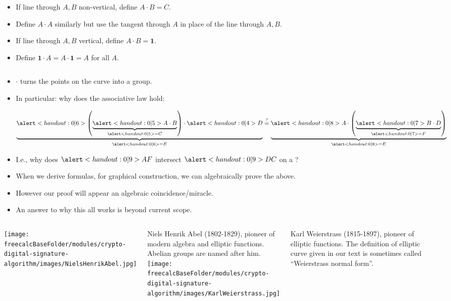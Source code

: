 \begin{frame}[fragile]
\begin{columns}
	\begin{definition}
		\begin{itemize}
			\item If line through $A,B$ non-vertical, define $A\cdot B = C$.
			\item Define $A\cdot A$ similarly but use the tangent through $A$ in place of the line through $A, B$.
			\item If line through $A,B$ vertical, define $A\cdot B = \mathbf 1$.
			\item Define $\mathbf 1\cdot A = A\cdot \mathbf 1 = A$ for all $ A$.
		\end{itemize}
	\end{definition}
\end{columns}
\begin{itemize}
\item<2-> $\cdot$ turns the points on the curve into a group.
\item<3-> In particular: why does the associative law hold:

\hfil \hfil $ \underbrace{ \alertNoH{6}{ \left( \underbrace{ \alertNoH{5}{A\cdot B}}_{\alertNoH{5}{=C} } \right) \cdot\alertNoH{4}{ D}} }_{\alertNoH{6}{ =E}} \stackrel{?}{=}  \underbrace{\alertNoH{8}{ A\cdot \left( \underbrace{ \alertNoH{7}{B\cdot D}}_{\alertNoH{7}{=F}}\right) } }_{\alertNoH{8}{=E}}$
\item<9-> I.e., why does  $\alertNoH{9}{AF}$ intersect $\alertNoH{9}{DC}$ on a ?
\item<10-> When we derive formulas, for graphical construction, we can algebraically prove the above.
\item<11-> However our proof will appear an algebraic coincidence/miracle.
\item<12-> An answer to why this all works is beyond current scope.
\end{itemize}



\vskip 10cm

\end{frame}

\begin{frame}
\begin{columns}[T]
\texttt{[image: \\freecalcBaseFolder/modules/crypto-digital-signature-algorithm/images/NielsHenrikAbel.jpg]}

Niels Henrik Abel (1802-1829), pioneer of modern algebra and elliptic functions. Abelian groups are named after him.
\texttt{[image: \\freecalcBaseFolder/modules/crypto-digital-signature-algorithm/images/KarlWeierstrass.jpg]}

Karl Weierstrass (1815-1897), pioneer of elliptic functions. The definition of elliptic curve given in our text is sometimes called ``Weierstrass normal form''.

\end{columns}
\end{frame}